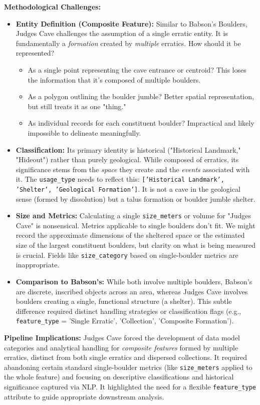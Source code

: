 \textbf{Methodological Challenges:}
\begin{itemize}
    \item \textbf{Entity Definition (Composite Feature):} Similar to Babson's Boulders, Judges Cave challenges the assumption of a single erratic entity. It is fundamentally a \emph{formation} created by \emph{multiple} erratics. How should it be represented?
        \begin{itemize}
            \item As a single point representing the cave entrance or centroid? This loses the information that it's composed of multiple boulders.
            \item As a polygon outlining the boulder jumble? Better spatial representation, but still treats it as one "thing."
            \item As individual records for each constituent boulder? Impractical and likely impossible to delineate meaningfully.
        \end{itemize}
    \item \textbf{Classification:} Its primary identity is historical ("Historical Landmark," "Hideout") rather than purely geological. While composed of erratics, its significance stems from the \emph{space} they create and the \emph{events} associated with it. The \texttt{usage\_type} needs to reflect this: \texttt{['Historical Landmark', 'Shelter', 'Geological Formation']}. It is not a cave in the geological sense (formed by dissolution) but a talus formation or boulder jumble shelter.
    \item \textbf{Size and Metrics:} Calculating a single \texttt{size\_meters} or volume for "Judges Cave" is nonsensical. Metrics applicable to single boulders don't fit. We might record the approximate dimensions of the sheltered space or the estimated size of the largest constituent boulders, but clarity on what is being measured is crucial. Fields like \texttt{size\_category} based on single-boulder metrics are inappropriate.
    \item \textbf{Comparison to Babson's:} While both involve multiple boulders, Babson's are discrete, inscribed objects across an area, whereas Judges Cave involves boulders creating a single, functional structure (a shelter). This subtle difference required distinct handling strategies or classification flags (e.g., \texttt{feature\_type} = 'Single Erratic', 'Collection', 'Composite Formation').
\end{itemize}

\textbf{Pipeline Implications:} Judges Cave forced the development of data model categories and analytical handling for \emph{composite features} formed by multiple erratics, distinct from both single erratics and dispersed collections. It required abandoning certain standard single-boulder metrics (like \texttt{size\_meters} applied to the whole feature) and focusing on descriptive classifications and historical significance captured via NLP. It highlighted the need for a flexible \texttt{feature\_type} attribute to guide appropriate downstream analysis.

